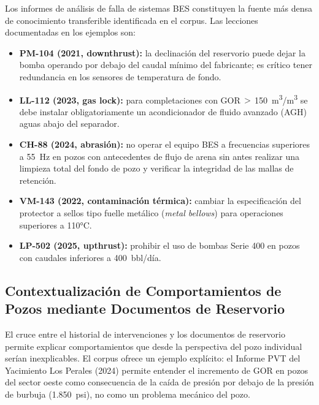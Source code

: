 \documentclass[12pt, a4paper]{article}
\begin{document}
Los informes de an\'{a}lisis de falla de sistemas BES constituyen la fuente m\'{a}s densa
de conocimiento transferible identificada en el corpus. Las lecciones documentadas en los
ejemplos son:

\begin{itemize}
  \item \textbf{PM-104 (2021, downthrust):} la declinaci\'{o}n del reservorio puede dejar la
        bomba operando por debajo del caudal m\'{i}nimo del fabricante; es cr\'{i}tico tener
        redundancia en los sensores de temperatura de fondo.
  \item \textbf{LL-112 (2023, gas lock):} para completaciones con
        GOR\,$>$\,150~m\textsuperscript{3}/m\textsuperscript{3} se debe instalar
        obligatoriamente un acondicionador de fluido avanzado (AGH) aguas abajo del separador.
  \item \textbf{CH-88 (2024, abrasi\'{o}n):} no operar el equipo BES a frecuencias superiores
        a 55~Hz en pozos con antecedentes de flujo de arena sin antes realizar una limpieza
        total del fondo de pozo y verificar la integridad de las mallas de retenci\'{o}n.
  \item \textbf{VM-143 (2022, contaminaci\'{o}n t\'{e}rmica):} cambiar la especificaci\'{o}n
        del protector a sellos tipo fuelle met\'{a}lico (\textit{metal bellows}) para
        operaciones superiores a 110°C.
  \item \textbf{LP-502 (2025, upthrust):} prohibir el uso de bombas Serie 400 en pozos con
        caudales inferiores a 400~bbl/d\'{i}a.
\end{itemize}

\subsection{Contextualizaci\'{o}n de Comportamientos de Pozos mediante Documentos de Reservorio}

El cruce entre el historial de intervenciones y los documentos de reservorio permite
explicar comportamientos que desde la perspectiva del pozo individual ser\'{i}an
inexplicables. El corpus ofrece un ejemplo expl\'{i}cito: el Informe PVT del Yacimiento Los
Perales (2024) permite entender el incremento de GOR en pozos del sector oeste como
consecuencia de la ca\'{i}da de presi\'{o}n por debajo de la presi\'{o}n de burbuja
(1.850~psi), no como un problema mec\'{a}nico del pozo.
\end{document}
